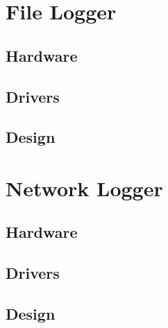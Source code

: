 

\section{File Logger}
\label{sec:filelogger}
\subsection{Hardware}


\subsection{ Drivers}


\subsection {Design}

\section{Network Logger}

\subsection{Hardware}


\subsection{ Drivers}


\subsection {Design}






